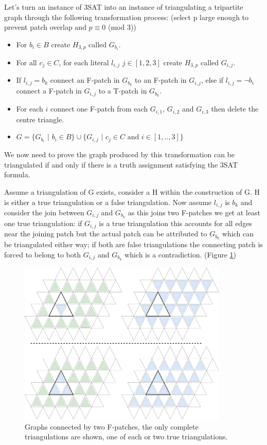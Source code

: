 \documentclass[a4paper,11pt]{report}
\begin{document}
Let's turn an instance of 3SAT into an instance of triangulating a tripartite graph through the following transformation process: (select p large enough to prevent patch overlap and  $p\equiv 0 $ (mod 3))
\begin{itemize}
\item For $b_i\in B$ create $H_{3,p}$ called $G_{b_i}$.
\item For all $c_j\in C$, for each literal $l_{i,j}$ $j\in [1,2,3]$ create $H_{3,p}$ called $G_{i,j}$.
\item If $l_{i,j}=b_k$ connect an F-patch in $G_{b_k}$ to an F-patch in $G_{i,j}$, else if $l_{i,j}=\neg b_i$ connect a F-patch in $G_{i,j}$ to a T-patch in $G_{b_k}$.
\item For each $i$ connect one F-patch from each $G_{i,1}$, $G_{i,2}$ and $G_{i,3}$ then delete the centre triangle. 
\item $G = \{G_{b_i}$ $|$ $b_i \in B\}\cup\{G_{i,j}$ $|$ $ c_j\in C\text{ and }i\in [1,..,3] \}$
\end{itemize}
We now need to prove the graph produced by this transformation can be triangulated if and only if there is a truth assignment satisfying the 3SAT formula.

Assume a triangulation of G exists, consider a H within the construction of G. H is either a true triangulation or a false triangulation. Now assume $l_{i,j}$ is $b_k$ and consider the join between $G_{i,j}$ and $G_{b_k}$ as this joins two F-patches we get at least one true triangulation: if $G_{i,j}$ is a true triangulation this accounts for all edges near the joining patch but the actual patch can be attributed to $G_{b_k}$ which can be triangulated either way; if both are false triangulations the connecting patch is forced to belong to both $G_{i,j}$ and $G_{b_k}$ which is a contradiction. (Figure \ref{holyerone})

\begin{figure}[h!]
\begin{center}
		\includegraphics[width=100mm]{figures/first_holyer_lemma.png}
\end{center}
		\caption{Graphs connected by two F-patches, the only complete triangulations are shown, one of each or two true triangulations.}
\label{holyerone}
\end{figure}
\end{document}
